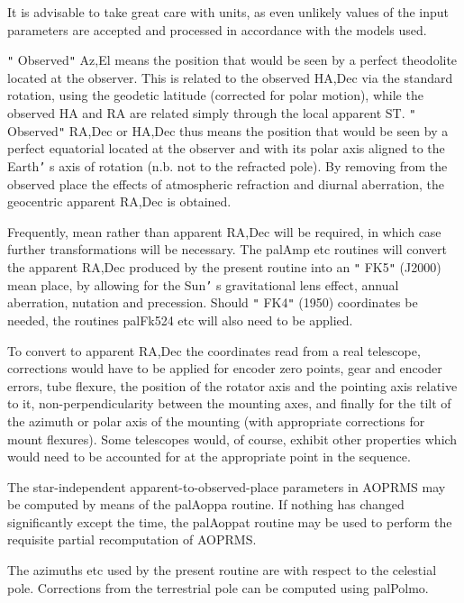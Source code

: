 \documentclass[twoside,11pt,nolof]{starlink}
\begin{document}
{{{         \sstitem
          It is advisable to take great care with units, as even
         unlikely values of the input parameters are accepted and
         processed in accordance with the models used.

         \sstitem
          \texttt{"} Observed\texttt{"}  Az,El means the position that would be seen by a
         perfect theodolite located at the observer.  This is
         related to the observed HA,Dec via the standard rotation, using
         the geodetic latitude (corrected for polar motion), while the
         observed HA and RA are related simply through the local
         apparent ST.  \texttt{"} Observed\texttt{"}  RA,Dec or HA,Dec thus means the
         position that would be seen by a perfect equatorial located
         at the observer and with its polar axis aligned to the
         Earth\texttt{'} s axis of rotation (n.b. not to the refracted pole).
         By removing from the observed place the effects of
         atmospheric refraction and diurnal aberration, the
         geocentric apparent RA,Dec is obtained.

         \sstitem
          Frequently, mean rather than apparent RA,Dec will be required,
         in which case further transformations will be necessary.  The
         palAmp etc routines will convert the apparent RA,Dec produced
         by the present routine into an \texttt{"} FK5\texttt{"}  (J2000) mean place, by
         allowing for the Sun\texttt{'} s gravitational lens effect, annual
         aberration, nutation and precession.  Should \texttt{"} FK4\texttt{"}  (1950)
         coordinates be needed, the routines palFk524 etc will also
         need to be applied.

         \sstitem
          To convert to apparent RA,Dec the coordinates read from a
         real telescope, corrections would have to be applied for
         encoder zero points, gear and encoder errors, tube flexure,
         the position of the rotator axis and the pointing axis
         relative to it, non-perpendicularity between the mounting
         axes, and finally for the tilt of the azimuth or polar axis
         of the mounting (with appropriate corrections for mount
         flexures).  Some telescopes would, of course, exhibit other
         properties which would need to be accounted for at the
         appropriate point in the sequence.

         \sstitem
          The star-independent apparent-to-observed-place parameters
         in AOPRMS may be computed by means of the palAoppa routine.
         If nothing has changed significantly except the time, the
         palAoppat routine may be used to perform the requisite
         partial recomputation of AOPRMS.

         \sstitem
          The azimuths etc used by the present routine are with respect
         to the celestial pole.  Corrections from the terrestrial pole
         can be computed using palPolmo.
      }
   }
}
\end{document}
